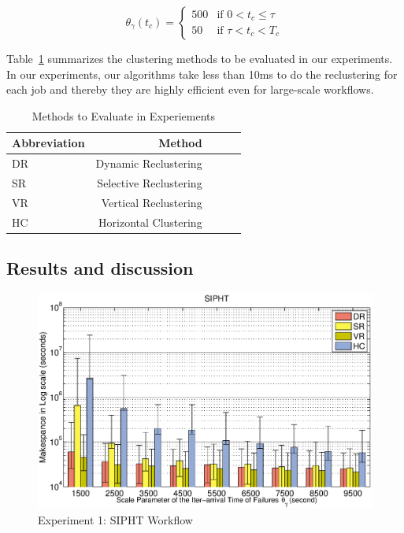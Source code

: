 \begin{equation}
\label{eq:pulse_function}
 \theta_{\gamma}(t_c) =
  \begin{cases}
   500 & \text{if } 0< t_c \leq \tau \\
   50       & \text{if } \tau< t_c < T_c
  \end{cases}
\end{equation}

Table~\ref{tab:evaluation_methods} summarizes the clustering methods to be evaluated in our experiments. In our experiments, our algorithms take less than 10ms to do the reclustering for each job and thereby they are highly efficient even for large-scale workflows. 
\begin{table}[!htb]
	\centering
	\small
	\begin{tabular}{l|rrrr}
		\hline
		Abbreviation	& Method	  \\
		\hline
		DR 		& Dynamic Reclustering		\\
		SR 		&Selective Reclustering\\
		VR 	&Vertical Reclustering\\
		HC 	&Horizontal Clustering \\
		\hline
	\end{tabular}
	\caption{Methods to Evaluate in Experiements}
	\label{tab:evaluation_methods}
\end{table} 


\subsection{Results and discussion}
\label{sec:tolerance:results}

\begin{figure}[!htb]
\centering
  \includegraphics[width=1\linewidth]{figures/tolerance/sipht.eps}
  \caption{Experiment 1: SIPHT Workflow}
  \label{fig:expr_sipht}
\end{figure}

